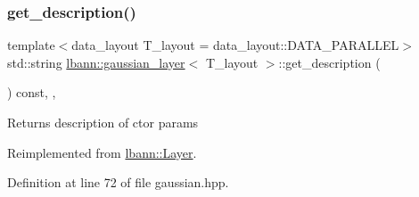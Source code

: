 \subsubsection{\texorpdfstring{get\+\_\+description()}{get\_description()}}
{\footnotesize\ttfamily template$<$data\+\_\+layout T\+\_\+layout = data\+\_\+layout\+::\+D\+A\+T\+A\+\_\+\+P\+A\+R\+A\+L\+L\+EL$>$ \\
std\+::string \hyperlink{classlbann_1_1gaussian__layer}{lbann\+::gaussian\+\_\+layer}$<$ T\+\_\+layout $>$\+::get\+\_\+description (\begin{DoxyParamCaption}{ }\end{DoxyParamCaption}) const\hspace{0.3cm}{\ttfamily [inline]}, {\ttfamily [override]}, {\ttfamily [virtual]}}

Returns description of ctor params 

Reimplemented from \hyperlink{classlbann_1_1Layer_acc0803d3428914ca1eb5988c4309174a}{lbann\+::\+Layer}.



Definition at line 72 of file gaussian.\+hpp.


